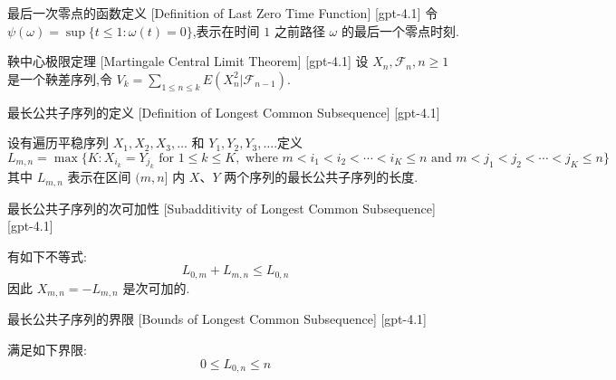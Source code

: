 \documentclass[UTF8]{ctexart}
\begin{document}
    
    
    \begin{dfn}
        {最后一次零点的函数定义}
        [Definition of Last Zero Time Function]
        [gpt-4.1]
        令 $\psi(\omega) = \sup\{t \leq 1 : \omega(t) = 0\}$,表示在时间 $1$ 之前路径 $\omega$ 的最后一个零点时刻.
    \end{dfn}
    
    
    
    \begin{thm}
        {鞅中心极限定理}
        [Martingale Central Limit Theorem]
        [gpt-4.1]
        设 $X_n, \mathcal{F}_n, n \geq 1$ 是一个鞅差序列,令 $V_k = \sum_{1 \leq n \leq k} E ( X_n^2 | \mathcal{F}_{n-1} )$.
    \end{thm}
    
    
    
    \begin{dfn}
        {最长公共子序列的定义}
        [Definition of Longest Common Subsequence]
        [gpt-4.1]
        
设有遍历平稳序列 $X_{1}, X_{2}, X_{3}, \ldots$ 和 $Y_{1}, Y_{2}, Y_{3}, \ldots$.定义
\[
L_{m, n} = \max \{ K : X_{i_{k}} = Y_{j_{k}} \text{ for } 1 \leq k \leq K, \text{ where } m < i_{1} < i_{2} < \cdots < i_{K} \leq n \text{ and } m < j_{1} < j_{2} < \cdots < j_{K} \leq n \}
\]
其中 $L_{m, n}$ 表示在区间 $(m, n]$ 内 $X$、$Y$ 两个序列的最长公共子序列的长度.

    \end{dfn}
    
    
    
    \begin{ppt}
        {最长公共子序列的次可加性}
        [Subadditivity of Longest Common Subsequence]
        [gpt-4.1]
        
有如下不等式:
\[
L_{0, m} + L_{m, n} \leq L_{0, n}
\]
因此 $X_{m, n} = - L_{m, n}$ 是次可加的.

    \end{ppt}
    
    
    
    \begin{ppt}
        {最长公共子序列的界限}
        [Bounds of Longest Common Subsequence]
        [gpt-4.1]
        
满足如下界限:
\[
0 \leq L_{0, n} \leq n
\]

    \end{ppt}
    
\end{document}

